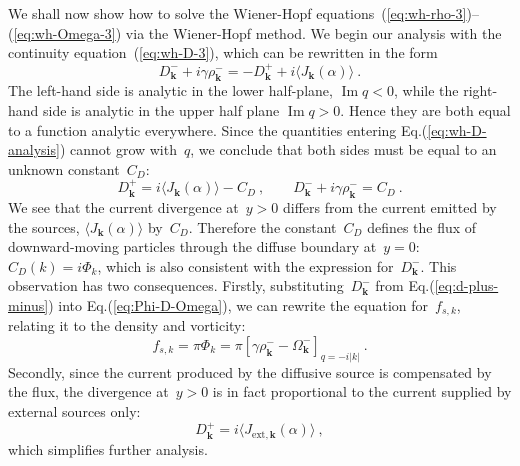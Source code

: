 \documentclass[preprint,aps,eqsecnum]{revtex4-1}
\newcommand{\fplus}[1]{{#1}^{+}}
\newcommand{\fminus}[1]{{#1}^{-}}
\renewcommand{\Im}{\mathop{\mathrm{Im}}\nolimits}
\begin{document}
We shall now show how to solve the Wiener-Hopf
equations~(\ref{eq:wh-rho-3})--(\ref{eq:wh-Omega-3})
via the Wiener-Hopf method. We begin our analysis with the continuity
equation~(\ref{eq:wh-D-3}), which can be rewritten  in the form
\begin{equation}
  \label{eq:wh-D-analysis}
  \fminus{D}_{\bm k} + i \gamma \fminus{\rho}_{\bm k}
      = - \fplus{D}_{\bm k} + i \langle J_{\bm k}(\alpha) \rangle \ .
\end{equation}
The left-hand side is analytic in the lower half-plane, $\Im q < 0$,
while the right-hand side is analytic in the upper half plane $\Im q > 0$.
Hence they are both equal to a function analytic everywhere.
Since the quantities entering Eq.(\ref{eq:wh-D-analysis}) cannot grow with~$q$,
we conclude that both sides must be equal to an unknown constant~$C_D$:
\begin{equation}
  \label{eq:d-plus-minus}
\fplus{D}_{\bm k} = i  \langle J_{\bm k}(\alpha) \rangle - C_D\ ,
\qquad
\fminus{D}_{\bm k} + i \gamma \fminus{\rho}_{\bm k} = C_D  \ .
\end{equation}
We see that the current divergence at~$y > 0$ differs from the current emitted by
the sources, $\langle J_{\bm k}(\alpha) \rangle$ by~$C_D$.
Therefore the constant~$C_D$ defines
the flux of downward-moving particles through the diffuse boundary
at~$y = 0$: $C_D(k) = i\Phi_{k}$, which is also consistent
with the expression for~$\fminus{D}_{\bm k}$.
This observation has two consequences.
Firstly, substituting~$\fminus{D}_{\bm k}$ from Eq.(\ref{eq:d-plus-minus})
into Eq.(\ref{eq:Phi-D-Omega}), we can rewrite the equation for~$f_{s, k}$,
relating it to the density and vorticity:
\begin{equation}
  \label{eq:flux-rho-Omega}
  f_{s, k} = \pi \Phi_{k} = \pi \left[\gamma \fminus{\rho}_{\bm k}
                        - \fminus{\Omega}_{\bm k}\right]_{q = -i |k|}
  \ .
\end{equation}
Secondly, since the current produced by the diffusive source is compensated
by the flux, the divergence at~$y > 0$ is in fact proportional to the current
supplied by external sources only:
\begin{equation}
  \label{eq:solution-D}
 \fplus{D}_{\bm k} = i \langle J_{\mathrm{ext}, {\bm k}}(\alpha) \rangle
 \ ,
\end{equation}
which simplifies further analysis.
\end{document}
